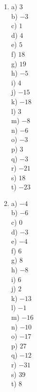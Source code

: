 \documentclass{exam}
\begin{document}
\begin{multicols*}{4}
\begin{enumerate}
\item 	a) $3$ \\
		b) $-3$ \\
		c) $1$ \\
		d) $4$ \\
		e) $5$ \\
		f) $18$ \\
		g) $19$ \\
		h) $-5$ \\
		i) $4$ \\
		j) $-15$ \\
		k) $-18$ \\
		l) $3$ \\
		m) $-8$ \\
		n) $-6$ \\
		o) $-3$ \\
		p) $3$ \\
		q) $-3$ \\
		r) $-21$ \\
		s) $18$ \\
		t) $-23$ \\

\item 	a) $-4$ \\
		b) $-6$ \\
		c) $0$ \\
		d) $-3$ \\
		e) $-4$ \\
		f) $6$ \\
		g) $8$ \\
		h) $-8$ \\
		i) $6$ \\
		j) $2$ \\
		k) $-13$ \\
		l) $-1$ \\
		m) $-16$ \\
		n) $-10$ \\
		o) $-17$ \\
		p) $27$ \\
		q) $-12$ \\
		r) $-31$ \\
		s) $39$ \\
		t) $8$ \\



\end{enumerate}
\end{multicols*}
\end{document}
